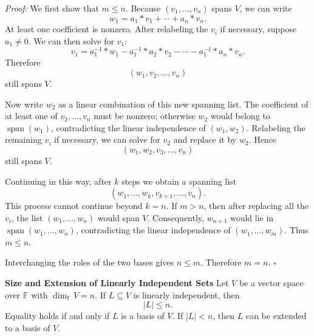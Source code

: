 \documentclass[a4paper,11pt,abstract=true]{scrartcl}
\theoremstyle{dotlessP}
\theoremstyle{dotlessS}
\theoremstyle{remark}
\theoremstyle{definition}
\begin{document}
\begin{claim_box}
\textit{Proof:} We first show that $m\leq n$. Because
$(v_1,\ldots,v_n)$ spans $V$, we can write
\[
w_1=a_1*v_1+\cdots+a_n*v_n.
\]
At least one coefficient is nonzero. After relabeling the $v_i$ if necessary,
suppose $a_1\neq0$. We can then solve for $v_1$:
\[
v_1=a_1^{-1}*w_1-a_1^{-1}*a_2*v_2-\cdots-a_1^{-1}*a_n*v_n.
\]
Therefore
\[
(w_1,v_2,\ldots,v_n)
\]
still spans $V$.

Now write $w_2$ as a linear combination of this new spanning list. The
coefficient of at least one of $v_2,\ldots,v_n$ must be nonzero; otherwise
$w_2$ would belong to $\operatorname{span}(w_1)$, contradicting the linear
independence of $(w_1,w_2)$. Relabeling the remaining $v_i$ if necessary, we
can solve for $v_2$ and replace it by $w_2$. Hence
\[
(w_1,w_2,v_3,\ldots,v_n)
\]
still spans $V$.

Continuing in this way, after $k$ steps we obtain a spanning list
\[
(w_1,\ldots,w_k,v_{k+1},\ldots,v_n).
\]
This process cannot continue beyond $k=n$. If $m>n$, then after replacing all
the $v_i$, the list $(w_1,\ldots,w_n)$ would span $V$. Consequently,
$w_{n+1}$ would lie in $\operatorname{span}(w_1,\ldots,w_n)$, contradicting
the linear independence of $(w_1,\ldots,w_m)$. Thus $m\leq n$.

Interchanging the roles of the two bases gives $n\leq m$. Therefore
$m=n$. \hfill$\square$
\end{claim_box}

\begin{problem_box}
\textbf{Size and Extension of Linearly Independent Sets} Let $V$
be a vector space over $\mathbb{F}$ with $\dim_{\mathbb{F}} V=n$. If $L\subseteq V$ is linearly
independent, then
\[
|L|\leq n.
\]
Equality holds if and only if $L$ is a basis of $V$. If $|L|<n$, then $L$
can be extended to a basis of $V$.
\end{problem_box}
\end{document}
